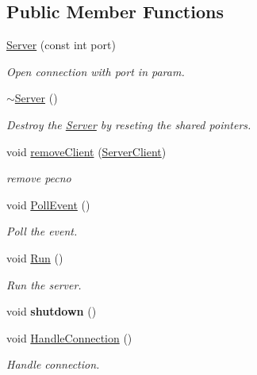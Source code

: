 \subsection*{Public Member Functions}
\begin{DoxyCompactItemize}
\item 
\hyperlink{classns_1_1_server_a349ed2f3b045602da2f1b9b91a11b78c}{Server} (const int port)
\begin{DoxyCompactList}\small\item\em Open connection with port in param. \end{DoxyCompactList}\item 
\hyperlink{classns_1_1_server_a4b3aa2579cb1c8cd1d069582c14d0fa6}{$\sim$\+Server} ()
\begin{DoxyCompactList}\small\item\em Destroy the \hyperlink{classns_1_1_server}{Server} by reseting the shared pointers. \end{DoxyCompactList}\item 
void \hyperlink{classns_1_1_server_a101fc02efc9caec89146f34619c03e95}{remove\+Client} (\hyperlink{class_server_client}{Server\+Client})
\begin{DoxyCompactList}\small\item\em remove pecno \end{DoxyCompactList}\item 
void \hyperlink{classns_1_1_server_a9e8e68bd5147b294ed9a0d23c1189f6d}{Poll\+Event} ()
\begin{DoxyCompactList}\small\item\em Poll the event. \end{DoxyCompactList}\item 
void \hyperlink{classns_1_1_server_ac0ac436c081e25c992d2b6dd1632ff71}{Run} ()
\begin{DoxyCompactList}\small\item\em Run the server. \end{DoxyCompactList}\item 
\mbox{\label{classns_1_1_server_abf2a4da899c012d24a89a003fc2b3366}} 
void {\bfseries shutdown} ()
\item 
void \hyperlink{classns_1_1_server_add5a181b9d70456b7e80cb258f32b8fd}{Handle\+Connection} ()
\begin{DoxyCompactList}\small\item\em Handle connection. \end{DoxyCompactList}\item 

\end{DoxyCompactItemize}
